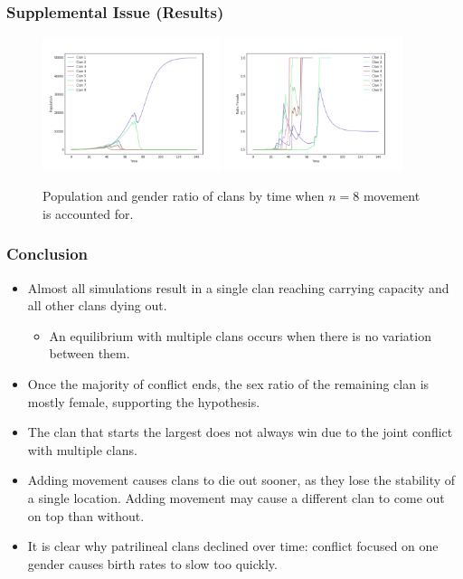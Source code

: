 \documentclass[t]{beamer}
\begin{document}
\begin{frame}
\frametitle{Supplemental Issue (Results)}

\begin{figure}
\includegraphics[width=5.2cm]{population_moving.png}
\includegraphics[width=5.2cm]{ratio_female_moving.png}
\caption{Population and gender ratio of clans by time when $n=8$ movement is accounted for.}
\end{figure}

\end{frame}


\begin{frame}
\frametitle{Conclusion}
\begin{itemize}
    \item Almost all simulations result in a single clan reaching carrying capacity and all other clans dying out.
    \begin{itemize}
            \item An equilibrium with multiple clans occurs when there is no variation between them. %
    \end{itemize}
    \item Once the majority of conflict ends, the sex ratio of the remaining clan is mostly female, supporting the hypothesis. %
    \item The clan that starts the largest does not always win due to the joint conflict with multiple clans.
    \item Adding movement causes clans to die out sooner, as they lose the stability of a single location. Adding movement may cause a different clan to come out on top than without.
    \item It is clear why patrilineal clans declined over time: conflict focused on one gender causes birth rates to slow too quickly.
\end{itemize}

\end{frame}
\end{document}
